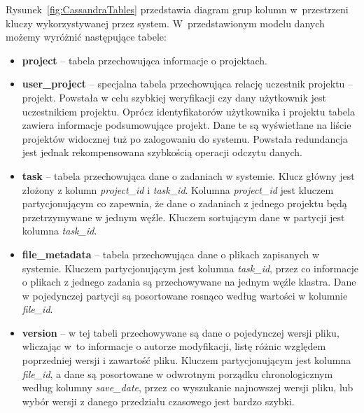 Rysunek~\ref{fig:CassandraTables} przedstawia diagram grup kolumn w~przestrzeni kluczy wykorzystywanej przez system.
W~przedstawionym modelu danych możemy wyróżnić następujące tabele:
\begin{itemize}

    \item \textbf{project} -- tabela przechowująca informacje o projektach.

    \item \textbf{user\_project} -- specjalna tabela przechowująca relację uczestnik projektu -- projekt. 
    Powstała w celu szybkiej weryfikacji czy dany użytkownik jest uczestnikiem projektu.
    Oprócz identyfikatorów użytkownika i projektu tabela zawiera informacje podsumowujące projekt. 
    Dane te są wyświetlane na liście projektów widocznej tuż po zalogowaniu do systemu.
    Powstała redundancja jest jednak rekompensowana szybkością operacji odczytu danych.

    \item \textbf{task} -- tabela przechowująca dane o zadaniach w systemie.
    Klucz główny jest złożony z kolumn \textit{project\_id} i \textit{task\_id}. 
    Kolumna \textit{project\_id} jest kluczem partycjonującym co zapewnia, że dane o zadaniach z jednego projektu będą przetrzymywane w jednym węźle.
    Kluczem sortującym dane w partycji jest kolumna \textit{task\_id}.

    \item \textbf{file\_metadata} -- tabela przechowująca dane o plikach zapisanych w systemie.
    Kluczem partycjonującym jest kolumna \textit{task\_id}, przez co informacje o plikach z jednego zadania są przechowywane na jednym węźle klastra.
    Dane w pojedynczej partycji są posortowane rosnąco według wartości w kolumnie \textit{file\_id}.

    \item \textbf{version} -- w tej tabeli przechowywane są dane o pojedynczej wersji pliku, wliczając w~to informacje o autorze modyfikacji, listę różnic względem poprzedniej wersji i zawartość pliku.
    Kluczem partycjonującym jest kolumna \textit{file\_id}, a dane są posortowane w odwrotnym porządku chronologicznym według kolumny \textit{save\_date}, przez co wyszukanie najnowszej wersji pliku, lub wybór wersji z danego przedziału czasowego jest bardzo szybki.
\end{itemize}


